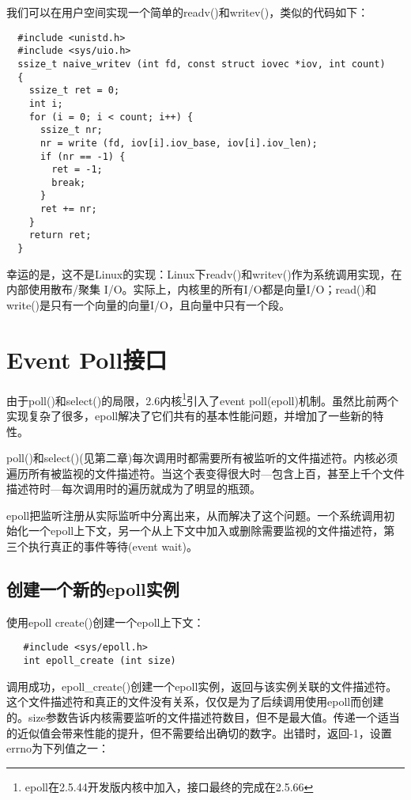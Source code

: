 我们可以在用户空间实现一个简单的readv()和writev()，类似的代码如下：

\begin{lstlisting}
  #include <unistd.h>
  #include <sys/uio.h>
  ssize_t naive_writev (int fd, const struct iovec *iov, int count)
  {
    ssize_t ret = 0;
    int i;
    for (i = 0; i < count; i++) {
      ssize_t nr;
      nr = write (fd, iov[i].iov_base, iov[i].iov_len);
      if (nr == -1) {
        ret = -1;
        break;
      }
      ret += nr; 
    }
    return ret;
  }
\end{lstlisting}

幸运的是，这不是Linux的实现：Linux下readv()和writev()作为系统调用实现，在内部使用散布/聚集 I/O。实际上，内核里的所有I/O都是向量I/O；read()和write()是只有一个向量的向量I/O，且向量中只有一个段。

\section{Event Poll接口}

由于poll()和select()的局限，2.6内核\footnote[1]{epoll在2.5.44开发版内核中加入，接口最终的完成在2.5.66}引入了event poll(epoll)机制。虽然比前两个实现复杂了很多，epoll解决了它们共有的基本性能问题，并增加了一些新的特性。

poll()和select()(见第二章)每次调用时都需要所有被监听的文件描述符。内核必须遍历所有被监视的文件描述符。当这个表变得很大时---包含上百，甚至上千个文件描述符时---每次调用时的遍历就成为了明显的瓶颈。

epoll把监听注册从实际监听中分离出来，从而解决了这个问题。一个系统调用初始化一个epoll上下文，另一个从上下文中加入或删除需要监视的文件描述符，第三个执行真正的事件等待(event wait)。

\subsection{创建一个新的epoll实例}

使用epoll create()创建一个epoll上下文：

\begin{lstlisting}
   #include <sys/epoll.h>
   int epoll_create (int size)
\end{lstlisting}

调用成功，epoll\_create()创建一个epoll实例，返回与该实例关联的文件描述符。这个文件描述符和真正的文件没有关系，仅仅是为了后续调用使用epoll而创建的。size参数告诉内核需要监听的文件描述符数目，但不是最大值。传递一个适当的近似值会带来性能的提升，但不需要给出确切的数字。出错时，返回-1，设置errno为下列值之一：

